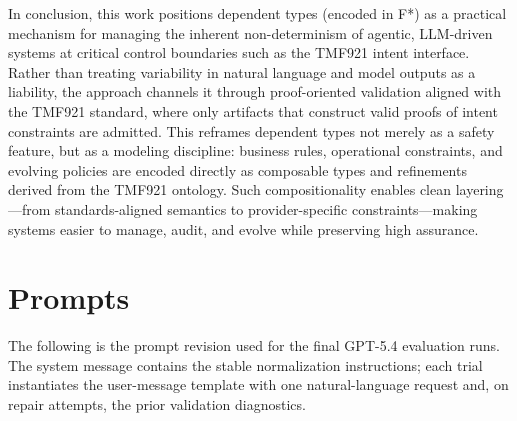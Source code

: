 \documentclass[conference]{IEEEtran}
\begin{document}
In conclusion, this work positions dependent types (encoded in F*) as a practical mechanism for managing the inherent non-determinism of agentic, LLM-driven systems at critical control boundaries such as the TMF921 intent interface. Rather than treating variability in natural language and model outputs as a liability, the approach channels it through proof-oriented validation aligned with the TMF921 standard, where only artifacts that construct valid proofs of intent constraints are admitted. This reframes dependent types not merely as a safety feature, but as a modeling discipline: business rules, operational constraints, and evolving policies are encoded directly as composable types and refinements derived from the TMF921 ontology. Such compositionality enables clean layering—from standards-aligned semantics to provider-specific constraints—making systems easier to manage, audit, and evolve while preserving high assurance.
\appendices
\section{Prompts}
\label{app:llm-prompt}

The following is the prompt revision used for the final GPT-5.4 evaluation runs. The system message contains the stable normalization instructions; each trial instantiates the user-message template with one natural-language request and, on repair attempts, the prior validation diagnostics.
\end{document}

